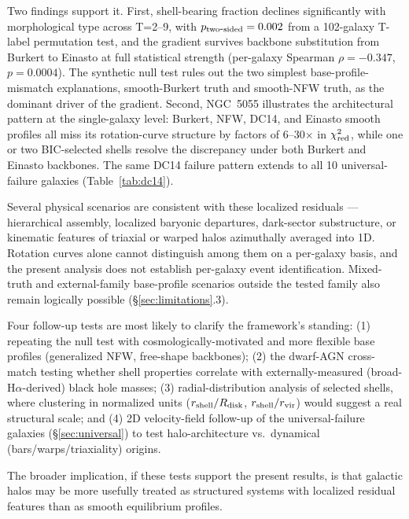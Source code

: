 Two findings support it. First, shell-bearing fraction declines significantly with morphological type across T=2--9, with $p_{\rm two\mbox{-}sided} = 0.002$ from a 102-galaxy T-label permutation test, and the gradient survives backbone substitution from Burkert to Einasto at full statistical strength (per-galaxy Spearman $\rho = -0.347$, $p = 0.0004$). The synthetic null test rules out the two simplest base-profile-mismatch explanations, smooth-Burkert truth and smooth-NFW truth, as the dominant driver of the gradient. Second, NGC~5055 illustrates the architectural pattern at the single-galaxy level: Burkert, NFW, DC14, and Einasto smooth profiles all miss its rotation-curve structure by factors of 6--30$\times$ in $\chi^2_{\rm red}$, while one or two BIC-selected shells resolve the discrepancy under both Burkert and Einasto backbones. The same DC14 failure pattern extends to all 10 universal-failure galaxies (Table~\ref{tab:dc14}).

Several physical scenarios are consistent with these localized residuals --- hierarchical assembly, localized baryonic departures, dark-sector substructure, or kinematic features of triaxial or warped halos azimuthally averaged into 1D. Rotation curves alone cannot distinguish among them on a per-galaxy basis, and the present analysis does not establish per-galaxy event identification. Mixed-truth and external-family base-profile scenarios outside the tested family also remain logically possible (\S\ref{sec:limitations}.3).

Four follow-up tests are most likely to clarify the framework's standing: (1) repeating the null test with cosmologically-motivated and more flexible base profiles (generalized NFW, free-shape backbones); (2) the \citet{ReinesGreeneGeha2013} dwarf-AGN cross-match testing whether shell properties correlate with externally-measured (broad-H$\alpha$-derived) black hole masses; (3) radial-distribution analysis of selected shells, where clustering in normalized units ($r_{\rm shell}/R_{\rm disk}$, $r_{\rm shell}/r_{\rm vir}$) would suggest a real structural scale; and (4) 2D velocity-field follow-up of the universal-failure galaxies (\S\ref{sec:universal}) to test halo-architecture vs.\ dynamical (bars/warps/triaxiality) origins.

The broader implication, if these tests support the present results, is that galactic halos may be more usefully treated as structured systems with localized residual features than as smooth equilibrium profiles.

\appendix
